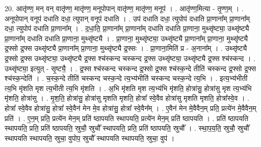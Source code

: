 \documentclass[17pt]{extarticle}
\begin{document}
20. आतृ॑ण्ण॒ मन् वन् वातृ॑ण्ण॒ मातृ॑ण्ण॒ मनूपोपान् वातृ॑ण्ण॒ मातृ॑ण्ण॒ मनूप॑ । . आतृ॑ण्ण॒मित्या - तृ॒ण्ण॒म् । . अनूपोपान् वनूप॑ दधाति दधा॒ त्युपान् वनूप॑ दधाति । . उप॑ दधाति दधा॒ त्युपोप॑ दधाति प्रा॒णाना᳚म् प्रा॒णाना᳚म् दधा॒ त्युपोप॑ दधाति प्रा॒णाना᳚म् । . द॒धा॒ति॒ प्रा॒णाना᳚म् प्रा॒णाना᳚म् दधाति दधाति प्रा॒णाना॒ मुथ्सृ॑ष्ट्या॒ उथ्सृ॑ष्ट्यै प्रा॒णाना᳚म् दधाति दधाति प्रा॒णाना॒ मुथ्सृ॑ष्ट्यै । . प्रा॒णाना॒ मुथ्सृ॑ष्ट्या॒ उथ्सृ॑ष्ट्यै प्रा॒णाना᳚म् प्रा॒णाना॒ मुथ्सृ॑ष्ट्यै द्र॒फ्सो द्र॒फ्स उथ्सृ॑ष्ट्यै प्रा॒णाना᳚म् प्रा॒णाना॒ मुथ्सृ॑ष्ट्यै द्र॒फ्सः । . प्रा॒णाना॒मिति॑ प्र - अ॒नाना᳚म् । . उथ्सृ॑ष्ट्यै द्र॒फ्सो द्र॒फ्स उथ्सृ॑ष्ट्या॒ उथ्सृ॑ष्ट्यै द्र॒फ्स श्च॑स्कन्द चस्कन्द द्र॒फ्स उथ्सृ॑ष्ट्या॒ उथ्सृ॑ष्ट्यै द्र॒फ्स श्च॑स्कन्द । . उथ्सृ॑ष्ट्या॒ इत्युत् - सृ॒ष्ट्यै॒ । . द्र॒फ्स श्च॑स्कन्द चस्कन्द द्र॒फ्सो द्र॒फ्स श्च॑स्क॒न्दे तीति॑ चस्कन्द द्र॒फ्सो द्र॒फ्स श्च॑स्क॒न्देति॑ । . च॒स्क॒न्दे तीति॑ चस्कन्द चस्क॒न्दे त्य॒भ्य॑भीति॑ चस्कन्द चस्क॒न्दे त्य॒भि । . इत्य॒भ्य॑भीती त्य॒भि मृ॑शति मृश त्य॒भीती त्य॒भि मृ॑शति । . अ॒भि मृ॑शति मृश त्य॒भ्य॑भि मृ॑शति॒ होत्रा॑सु॒ होत्रा॑सु मृश त्य॒भ्य॑भि मृ॑शति॒ होत्रा॑सु । . मृ॒श॒ति॒ होत्रा॑सु॒ होत्रा॑सु मृशति मृशति॒ होत्रा᳚ स्वे॒वैव होत्रा॑सु मृशति मृशति॒ होत्रा᳚स्वे॒व । . होत्रा᳚ स्वे॒वैव होत्रा॑सु॒ होत्रा᳚ स्वे॒वैन॑ मेन मे॒व होत्रा॑सु॒ होत्रा᳚ स्वे॒वैन᳚म् । . ए॒वैन॑ मेन मे॒वैवैन॒म् प्रति॒ प्रत्ये॑न मे॒वैवैन॒म् प्रति॑ । . ए॒न॒म् प्रति॒ प्रत्ये॑न मेन॒म् प्रति॑ ष्ठापयति स्थापयति॒ प्रत्ये॑न मेन॒म् प्रति॑ ष्ठापयति । . प्रति॑ ष्ठापयति स्थापयति॒ प्रति॒ प्रति॑ ष्ठापयति॒ स्रुचौ॒ स्रुचौ᳚ स्थापयति॒ प्रति॒ प्रति॑ ष्ठापयति॒ स्रुचौ᳚ । . स्था॒प॒य॒ति॒ स्रुचौ॒ स्रुचौ᳚ स्थापयति स्थापयति॒ स्रुचा॒ वुपोप॒ स्रुचौ᳚ स्थापयति स्थापयति॒ स्रुचा॒ वुप॑ । \newline
\end{document}

